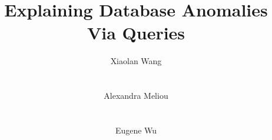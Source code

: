 


\newcommand{\codesize}{\fontsize{7}{8}}
\newcommand{\xxx}[1]{{\fontsize{20pt}{20pt}\selectfont\textcolor{red}{#1}}}
\newcommand{\ind}{\hspace{\algorithmicindent}}


\newcommand{\pdom}{{\sc Poly-Dom}\xspace}
\newcommand{\pdomind}{{\sc Poly-Dom-Index-All}\xspace}
\newcommand{\nlook}{{\sc Naive-Lookup}\xspace}

\newcommand{\nexp}{{\sc Naive-Expand-All}\xspace}
\newcommand{\gm}{{\sc Greedy}\xspace}
\newcommand{\gacc}{{\sc Greedy-Acc}\xspace}
\newcommand{\gcost}{{\sc Greedy-Cost}\xspace}


\newcommand{\red}[1]{\textcolor{red}{#1}}
\newcommand{\green}[1]{\textcolor{green}{#1}}
\newcommand{\blue}[1]{\textcolor{blue}{#1}}
\newcommand{\orange}[1]{\textcolor{orange}{#1}}
\newcommand{\darkred}[1]{\textcolor{darkred}{#1}}
\newcommand{\darkgreen}[1]{\textcolor{darkgreen}{#1}}
\newcommand{\darkblue}[1]{\textcolor{darkblue}{#1}}


\newcommand{\alx}[1]{\noindent{\textcolor{red}{Ted: #1}}}
\newcommand{\xlw}[1]{\noindent{\textcolor{red}{Aditya: #1}}}
\newcommand{\ewu}[1]{\noindent{\textcolor{red}{EWu: #1}}}
\newcommand{\stitle}[1]{\vspace{0.5em}\noindent\textbf{#1}}
\newcommand{\calF}[0]{$\cal{F}$}

\newcommand{\squishlist}{
   \begin{list}{$\bullet$}
    { \setlength{\itemsep}{0pt}
      \setlength{\parsep}{2pt}
      \setlength{\topsep}{6pt}
      \setlength{\partopsep}{0pt}
      \leftmargin=25pt
\rightmargin=0pt
\labelsep=5pt
\labelwidth=10pt
\itemindent=0pt
\listparindent=0pt
\itemsep=\parsep
    }
}
\newcommand{\squishend}{\end{list}}







\title{Explaining Database Anomalies Via Queries}

\author{
  \alignauthor Xiaolan Wang\\
    \\
    \\
  \alignauthor Alexandra Meliou\\
    \\
    \\
  \alignauthor Eugene Wu\\
    \\
    \\
}




